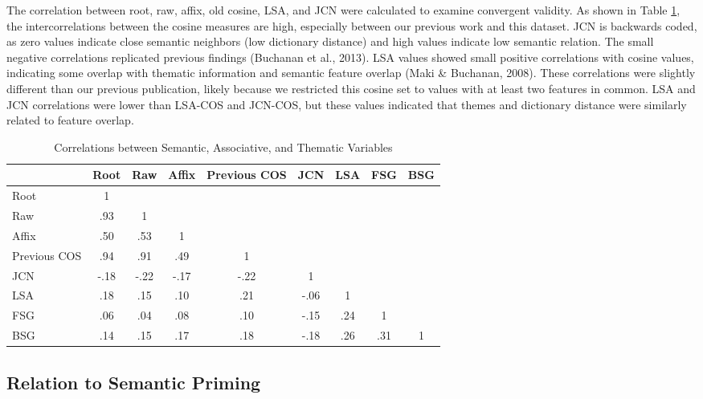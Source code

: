 \documentclass[english,man]{apa6}
\theoremstyle{definition}
\theoremstyle{definition}
\theoremstyle{definition}
\theoremstyle{remark}
\begin{document}
The correlation between root, raw, affix, old cosine, LSA, and JCN were
calculated to examine convergent validity. As shown in Table
\ref{tab:correlation-table}, the intercorrelations between the cosine
measures are high, especially between our previous work and this
dataset. JCN is backwards coded, as zero values indicate close semantic
neighbors (low dictionary distance) and high values indicate low
semantic relation. The small negative correlations replicated previous
findings (Buchanan et al., 2013). LSA values showed small positive
correlations with cosine values, indicating some overlap with thematic
information and semantic feature overlap (Maki \& Buchanan, 2008). These
correlations were slightly different than our previous publication,
likely because we restricted this cosine set to values with at least two
features in common. LSA and JCN correlations were lower than LSA-COS and
JCN-COS, but these values indicated that themes and dictionary distance
were similarly related to feature overlap.

\begin{table}[tbp]
\begin{center}
\begin{threeparttable}
\caption{\label{tab:correlation-table}Correlations between Semantic, Associative, and Thematic Variables}
\begin{tabular}{lcccccccc}
\toprule
  & Root & Raw & Affix & Previous COS & JCN & LSA & FSG & BSG\\
\midrule
Root & 1 &  &  &  &  &  &  & \\
Raw & .93 & 1 &  &  &  &  &  & \\
Affix & .50 & .53 & 1 &  &  &  &  & \\
Previous COS & .94 & .91 & .49 & 1 &  &  &  & \\
JCN & -.18 & -.22 & -.17 & -.22 & 1 &  &  & \\
LSA & .18 & .15 & .10 & .21 & -.06 & 1 &  & \\
FSG & .06 & .04 & .08 & .10 & -.15 & .24 & 1 & \\
BSG & .14 & .15 & .17 & .18 & -.18 & .26 & .31 & 1\\
\bottomrule
\end{tabular}
\end{threeparttable}
\end{center}
\end{table}

\subsection{Relation to Semantic
Priming}\label{relation-to-semantic-priming}
\end{document}
